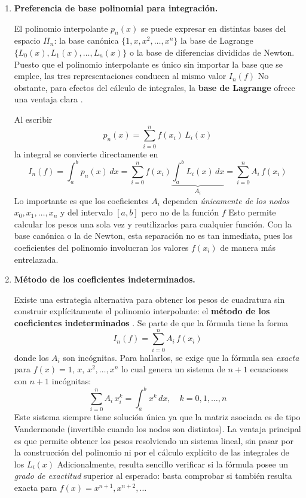 \documentclass[12pt]{article}
\begin{document}
\begin{enumerate}
	\item \textbf{Preferencia de base polinomial para integración.}

	El polinomio interpolante $p_n(x)$ se puede expresar en distintas bases del espacio $\Pi_n$: la base canónica $\{1,x,x^2,\ldots,x^n\}$ la base de Lagrange $\{L_0(x),L_1(x),\ldots,L_n(x)\}$ o la base de diferencias divididas de Newton. Puesto que el polinomio interpolante es único sin importar la base que se emplee, las tres representaciones conducen al mismo valor $I_n(f)$ No obstante, para efectos del cálculo de integrales, la \textbf{base de Lagrange} ofrece una ventaja clara \cite{burden02}.

	Al escribir
	\[
	p_n(x) = \sum_{i=0}^{n} f(x_i)\,L_i(x)
	\]
	la integral se convierte directamente en
	\[
	I_n(f) = \int_a^b p_n(x)\,dx = \sum_{i=0}^{n} f(x_i) \underbrace{\int_a^b L_i(x)\,dx}_{A_i} = \sum_{i=0}^{n} A_i\,f(x_i)
	\]
	Lo importante es que los coeficientes $A_i$ dependen \textit{únicamente de los nodos} $x_0,x_1,\ldots,x_n$ y del intervalo $[a,b]$ pero no de la función $f$ Esto permite calcular los pesos una sola vez y reutilizarlos para cualquier función. Con la base canónica o la de Newton, esta separación no es tan inmediata, pues los coeficientes del polinomio involucran los valores $f(x_i)$ de manera más entrelazada.

	\item \textbf{Método de los coeficientes indeterminados.}

	Existe una estrategia alternativa para obtener los pesos de cuadratura sin construir explícitamente el polinomio interpolante: el \textbf{método de los coeficientes indeterminados} \cite{chapra07}. Se parte de que la fórmula tiene la forma
	\[
	I_n(f) = \sum_{i=0}^{n} A_i\,f(x_i)
	\]
	donde los $A_i$ son incógnitas. Para hallarlos, se exige que la fórmula sea \textit{exacta} para $f(x) = 1,\, x,\, x^2, \ldots, x^n$ lo cual genera un sistema de $n+1$ ecuaciones con $n+1$ incógnitas:
	\[
	\sum_{i=0}^{n} A_i\,x_i^k = \int_a^b x^k\,dx, \quad k=0,1,\ldots,n
	\]
	Este sistema siempre tiene solución única ya que la matriz asociada es de tipo Vandermonde (invertible cuando los nodos son distintos). La ventaja principal es que permite obtener los pesos resolviendo un sistema lineal, sin pasar por la construcción del polinomio ni por el cálculo explícito de las integrales de los $L_i(x)$ Adicionalmente, resulta sencillo verificar si la fórmula posee un \textit{grado de exactitud} superior al esperado: basta comprobar si también resulta exacta para $f(x) = x^{n+1}, x^{n+2},\ldots$


\end{enumerate}
\end{document}
